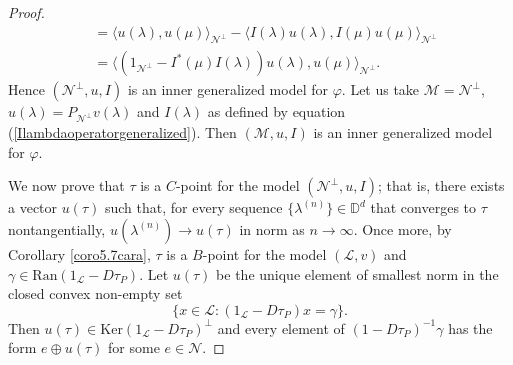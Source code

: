 \documentclass[11pt, reqno]{amsart}
\newcommand\1{\boldsymbol {1}}
\numberwithin{equation}{section}
\begin{document}
\begin{proof}
\begin{align}
    &=\langle u(\lambda),u(\mu)\rangle_{\mathcal{N}^{\perp}}-\langle I(\lambda)u(\lambda),I(\mu)u(\mu)\rangle_{\mathcal{N}^{\perp}}\nonumber\\
    &=\langle (1_{\mathcal{N}^{\perp}}-I^{*}(\mu)I(\lambda))u(\lambda),u(\mu)\rangle_{\mathcal{N}^{\perp}}.\label{generalizedmodelfirstappeareance}
\end{align}
Hence $(\mathcal{N}^{\perp}, u, I)$ is an inner generalized model for $\varphi$. Let us take $\mathcal{M}=\mathcal{N}^{\perp}$, $u(\lambda)=P_{\mathcal{N}^{\perp}}v(\lambda)$ and $I(\lambda)$ as defined by equation (\ref{Ilambdaoperatorgeneralized}). Then $(\mathcal{M}, u, I)$ is an inner generalized model for $\varphi$.

 We now prove that $\tau$ is a $C$-point for the model $(\mathcal{N}^{\perp},u,I)$; that is, there exists a vector $u(\tau)$ such that, for every sequence $\{\lambda^{(n)}\}\in\mathbb{D}^{d}$ that converges to $\tau$ nontangentially, $u(\lambda^{(n)})\rightarrow u(\tau)$ in norm  as $n\rightarrow \infty$.
Once more, by Corollary \ref{coro5.7cara}, $\tau$ is a $B$-point for the model $(\mathcal{L},v)$ and $\gamma\in\mathrm{Ran}(1_{\mathcal{L}}-D\tau_{P})$. Let $u(\tau)$ be the unique element of smallest norm in the closed convex non-empty set 
$$\Big\{ x\in\mathcal{L}:(1_{\mathcal{L}}-D\tau_{P})x=\gamma\Big\}.$$
Then $u(\tau)\in\mathrm{Ker}(1_{\mathcal{L}}-D\tau_{P})^{\perp}$ and every element of $(1-D\tau_{P})^{-1}\gamma$ has the form $e\oplus u(\tau)$ for some $e\in\mathcal{N}$.


\end{proof}
\end{document}
